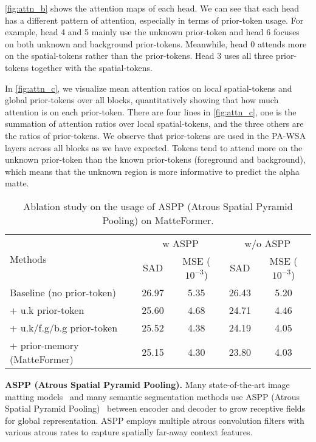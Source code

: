 \documentclass[10pt,twocolumn,letterpaper]{article}
\begin{document}
\cref{fig:attn_b} shows the attention maps of each head. We can see that each head has a different pattern of attention, especially in terms of prior-token usage. For example, head 4 and 5 mainly use the unknown prior-token and head 6 focuses on both unknown and background prior-tokens. Meanwhile, head 0 attends more on the spatial-tokens rather than the prior-tokens. Head 3 uses all three prior-tokens together with the spatial-tokens.

In \cref{fig:attn_c}, we visualize mean attention ratios on local spatial-tokens and global prior-tokens over all blocks, quantitatively showing that how much attention is on each prior-token. There are four lines in \cref{fig:attn_c}, one is the summation of attention ratios over local spatial-tokens, and the three others are the ratios of prior-tokens.
We observe that prior-tokens are used in the PA-WSA layers across all blocks as we have expected.
Tokens tend to attend more on the unknown prior-token than the known prior-tokens (foreground and background), which means that the unknown region is more informative to predict the alpha matte.

\label{sec:ASPP}

\begin{table}
   \begin{adjustbox}{width = \linewidth}
   \begin{tabular}{l | c c c c}
        \toprule
        \multirow{2}{*}{Methods} & \multicolumn{2}{c}{w ASPP} & \multicolumn{2}{c}{w/o ASPP} \\
        & SAD & \makecell{MSE \\ ($10^{-3}$)} & SAD & \makecell{MSE \\ ($10^{-3}$)} \\
        \hline
        Baseline (no prior-token) & 26.97 & 5.35 & 26.43 & 5.20 \\
        + u.k prior-token & 25.60 & 4.68 & 24.71 & 4.46 \\
        + u.k/f.g/b.g prior-token & 25.52 & 4.38 & 24.19 & 4.05 \\
        + prior-memory (MatteFormer) & 25.15 & 4.30 & 23.80 & 4.03 \\
        \bottomrule
    \end{tabular}
    \end{adjustbox}
    \caption{Ablation study on the usage of ASPP (Atrous Spatial Pyramid Pooling) on MatteFormer.}
    \label{tab:aspp}
\end{table}

\vspace{2mm}
\textbf{ASPP (Atrous Spatial Pyramid Pooling).} 
Many state-of-the-art image matting models~\cite{qiao2020attention, lin2021real, yu2021mask, sun2021semantic, liu2021tripartite} and many semantic segmentation methods use ASPP (Atrous Spatial Pyramid Pooling)~\cite{chen2017deeplab} between encoder and decoder to grow receptive fields for global representation. ASPP employs multiple atrous convolution filters with various atrous rates to capture spatially far-away context features. 
\end{document}
